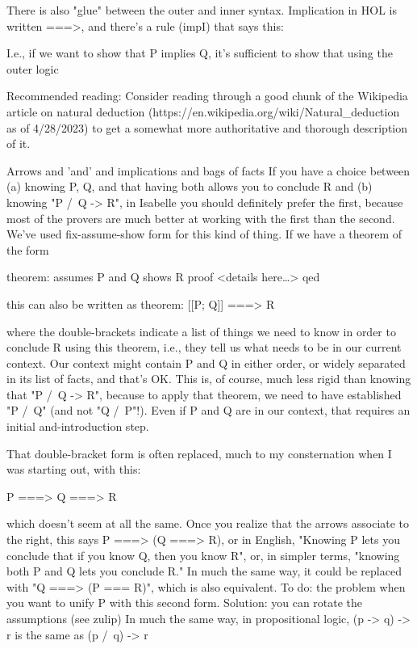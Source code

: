 There is also "glue" between the outer and inner syntax. Implication in HOL is written ===>, and there's a rule (impI) that says this:

I.e., if we want to show that P implies Q, it's sufficient to show that using the outer logic

Recommended reading: Consider reading through a good chunk of the Wikipedia article on natural deduction (https://en.wikipedia.org/wiki/Natural_deduction as of 4/28/2023) to get a somewhat more authoritative and thorough description of it. 

Arrows and 'and' and implications and bags of facts
If you have a choice between (a) knowing P, Q, and that having both allows you to conclude R and (b) knowing "P /\ Q -> R", in Isabelle you should definitely prefer the first, because most of the provers are much better at working with the first than the second. We've used fix-assume-show form for this kind of thing. If we have a theorem of the form

theorem:
   assumes P and Q   
   shows R
proof <details here…> qed

this can also be written as 
theorem:
   [[P; Q]] ===> R

where the double-brackets indicate a list of things we need to know in order to conclude R using this theorem, i.e., they tell us what needs to be in our current context. Our context might contain P and Q in either order, or widely separated in its list of facts, and that's OK. This is, of course, much less rigid than knowing that "P /\ Q -> R", because to apply that theorem, we need to have established "P /\ Q" (and not "Q /\ P"!). Even if P and Q are in our context, that requires an initial and-introduction step. 

That double-bracket form is often replaced, much to my consternation when I was starting out, with this: 

P ===> Q ===> R

which doesn't seem at all the same. Once you realize that the arrows associate to the right, this says P ===> (Q ===> R), or in English, "Knowing P lets you conclude that if you know Q, then you know R", or, in simpler terms, "knowing both P and Q lets you conclude R." In much the same way, it could be replaced with "Q ===> (P === R)", which is also equivalent. 
To do: the problem when you want to unify P with this second form. Solution: you can rotate the assumptions (see zulip)
In much the same way, in propositional logic, (p -> q) -> r is the same as (p /\ q) -> r

